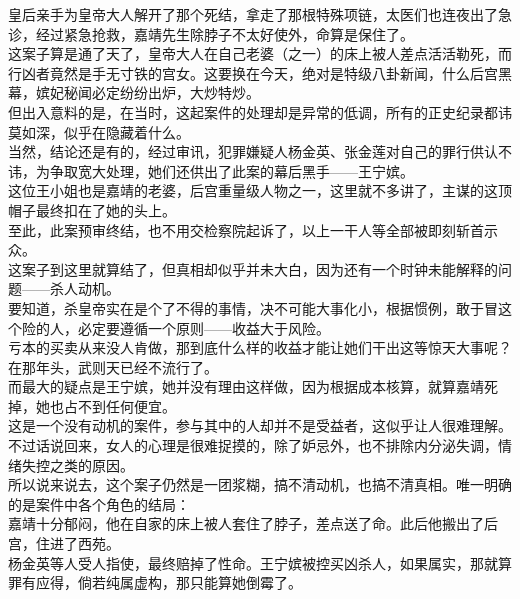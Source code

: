 \begin{multicols}{\theparacolNo}
皇后亲手为皇帝大人解开了那个死结，拿走了那根特殊项链，太医们也连夜出了急诊，经过紧急抢救，嘉靖先生除脖子不太好使外，命算是保住了。\\

这案子算是通了天了，皇帝大人在自己老婆（之一）的床上被人差点活活勒死，而行凶者竟然是手无寸铁的宫女。这要换在今天，绝对是特级八卦新闻，什么后宫黑幕，嫔妃秘闻必定纷纷出炉，大炒特炒。\\

但出入意料的是，在当时，这起案件的处理却是异常的低调，所有的正史纪录都讳莫如深，似乎在隐藏着什么。\\

当然，结论还是有的，经过审讯，犯罪嫌疑人杨金英、张金莲对自己的罪行供认不讳，为争取宽大处理，她们还供出了此案的幕后黑手——王宁嫔。\\

这位王小姐也是嘉靖的老婆，后宫重量级人物之一，这里就不多讲了，主谋的这顶帽子最终扣在了她的头上。\\

至此，此案预审终结，也不用交检察院起诉了，以上一干人等全部被即刻斩首示众。\\

这案子到这里就算结了，但真相却似乎并未大白，因为还有一个时钟未能解释的问题——杀人动机。\\

要知道，杀皇帝实在是个了不得的事情，决不可能大事化小，根据惯例，敢于冒这个险的人，必定要遵循一个原则——收益大于风险。\\

亏本的买卖从来没人肯做，那到底什么样的收益才能让她们干出这等惊天大事呢？在那年头，武则天已经不流行了。\\

而最大的疑点是王宁嫔，她并没有理由这样做，因为根据成本核算，就算嘉靖死掉，她也占不到任何便宜。\\

这是一个没有动机的案件，参与其中的人却并不是受益者，这似乎让人很难理解。不过话说回来，女人的心理是很难捉摸的，除了妒忌外，也不排除内分泌失调，情绪失控之类的原因。\\

所以说来说去，这个案子仍然是一团浆糊，搞不清动机，也搞不清真相。唯一明确的是案件中各个角色的结局：\\

嘉靖十分郁闷，他在自家的床上被人套住了脖子，差点送了命。此后他搬出了后宫，住进了西苑。\\

杨金英等人受人指使，最终赔掉了性命。王宁嫔被控买凶杀人，如果属实，那就算罪有应得，倘若纯属虚构，那只能算她倒霉了。\\


\end{multicols}
